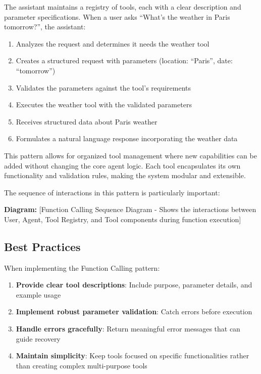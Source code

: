 \documentclass[11pt,oneside]{book}
\providecommand{\tightlist}{%
  \setlength{\itemsep}{0pt}\setlength{\parskip}{0pt}}
\begin{document}
The assistant maintains a registry of tools, each with a clear
description and parameter specifications. When a user asks ``What's the
weather in Paris tomorrow?'', the assistant:

\begin{enumerate}
\def\labelenumi{\arabic{enumi}.}
\tightlist
\item
  Analyzes the request and determines it needs the weather tool
\item
  Creates a structured request with parameters (location: ``Paris'',
  date: ``tomorrow'')
\item
  Validates the parameters against the tool's requirements
\item
  Executes the weather tool with the validated parameters
\item
  Receives structured data about Paris weather
\item
  Formulates a natural language response incorporating the weather data
\end{enumerate}

This pattern allows for organized tool management where new capabilities
can be added without changing the core agent logic. Each tool
encapsulates its own functionality and validation rules, making the
system modular and extensible.

The sequence of interactions in this pattern is particularly important:

\textbf{Diagram:} {[}Function Calling Sequence Diagram - Shows the
interactions between User, Agent, Tool Registry, and Tool components
during function execution{]}

\subsection{Best Practices}\label{best-practices-1}

When implementing the Function Calling pattern:

\begin{enumerate}
\def\labelenumi{\arabic{enumi}.}
\tightlist
\item
  \textbf{Provide clear tool descriptions}: Include purpose, parameter
  details, and example usage
\item
  \textbf{Implement robust parameter validation}: Catch errors before
  execution
\item
  \textbf{Handle errors gracefully}: Return meaningful error messages
  that can guide recovery
\item
  \textbf{Maintain simplicity}: Keep tools focused on specific
  functionalities rather than creating complex multi-purpose tools
\end{enumerate}
\end{document}
